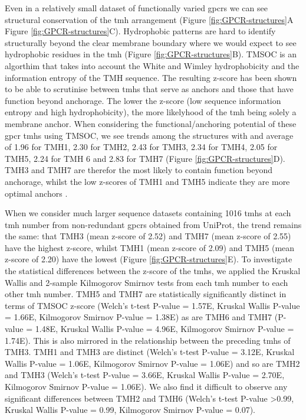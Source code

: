 Even in a relatively small dataset of functionally varied \gls{gpcr}s we can see structural conservation of the \gls{tmh} arrangement (Figure \ref{fig:GPCR-structures}A Figure \ref{fig:GPCR-structures}C).
Hydrophobic patterns are hard to identify structurally beyond the clear membrane boundary where we would expect to see hydrophobic residues in the \gls{tmh} (Figure \ref{fig:GPCR-structures}B).
TMSOC \cite{Wong2011, Wong2012} is an algorthim that takes into account the White and Wimley hydrophobicity \cite{White1999} and the information entropy of the TMH sequence.
The resulting z\--score has been shown to be able to scrutinise between \gls{tmh}s that serve as anchors and those that have function beyond anchorage.
The lower the z\--score (low sequence information entropy and high hydrophobicity), the more likelyhood of the \gls{tmh} being solely a membrane anchor.
When considering the functional/anchoring potential of these \gls{gpcr} \gls{tmh}s  using TMSOC, we see trends among the structures with and average of 1.96 for TMH1, 2.30 for TMH2, 2.43 for TMH3, 2.34 for TMH4, 2.05 for TMH5, 2.24 for TMH 6 and 2.83 for TMH7 (Figure \ref{fig:GPCR-structures}D).
TMH3 and TMH7 are therefor the most likely to contain function beyond anchorage, whilst the low z\--scores of TMH1 and TMH5 indicate they are more optimal anchors \cite{Baker2017}.

When we consider much larger sequence datasets containing 1016 \gls{tmh}s at each \gls{tmh} number from non-redundant \gls{gpcr}s obtained from UniProt, the trend remains the same: that TMH3 (mean z\--score of 2.52) and TMH7 (mean z\--score of 2.55) have the highest z\--score, whilst TMH1 (mean z\--score of 2.09) and TMH5 (mean z\--score of 2.20) have the lowest (Figure \ref{fig:GPCR-structures}E).
To investigate the statistical differences between the z\--score of the \gls{tmh}s, we applied the Kruskal Wallis and 2-sample Kilmogorov Smirnov tests from each \gls{tmh} number to each other \gls{tmh} number.
TMH5 and TMH7 are statistically significantly distinct in terms of TMSOC z\--score (Welch's t-test P\--value = 1.57E, Kruskal Wallis P\--value = 1.66E, Kilmogorov Smirnov P\--value = 1.38E) as are TMH6 and TMH7 (P\--value = 1.48E, Kruskal Wallis P\--value = 4.96E, Kilmogorov Smirnov P\--value = 1.74E).
This is also mirrored in the relationship between the preceding \gls{tmh}s of TMH3.
TMH1 and TMH3 are distinct (Welch's t-test P\--value = 3.12E, Kruskal Wallis P\--value = 1.06E, Kilmogorov Smirnov P\--value = 1.06E) and so are TMH2 and TMH3 (Welch's t-test P\--value = 3.66E, Kruskal Wallis P\--value = 2.70E, Kilmogorov Smirnov P\--value = 1.06E).
We also find it difficult to observe any significant differences between TMH2 and TMH6 (Welch's t\--test P\--value \textgreater 0.99, Kruskal Wallis P\--value = 0.99, Kilmogorov Smirnov P\--value = 0.07).

